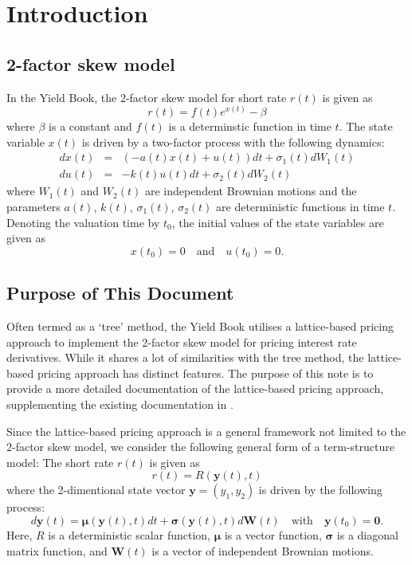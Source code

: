 \documentclass{texyise}
\begin{document}
\section{Introduction}

\subsection{2-factor skew model}

In the Yield Book, the 2-factor skew model for short rate $r(t)$ is given as
\begin{equation}
    r(t) = f(t) e^{x(t)} - \beta  \label{E:2fskew}
\end{equation}
where $\beta$ is a constant and $f(t)$ is a determinstic function in time $t$. The state variable $x(t)$ is driven by a two-factor process with the following dynamics:
\begin{eqnarray}
    dx(t) &=& (-a(t)x(t)+u(t))dt + \sigma_1(t) dW_1(t) \label{E:2fskew1} \\
    du(t) &=& -k(t)u(t)dt + \sigma_2(t) dW_2(t) \label{E:2fskew2}
\end{eqnarray}
where $W_1(t)$ and $W_2(t)$ are independent Brownian motions and the parameters $a(t)$, $k(t)$, $\sigma_1(t)$, $\sigma_2(t)$ are deterministic functions in time $t$.
Denoting the valuation time by $t_0$, the initial values of the state variables are given as
\begin{equation}
    x(t_0) = 0 \quad \text{and} \quad u(t_0) = 0.
\end{equation}

\subsection{Purpose of This Document}

Often termed as a `tree' method, the Yield Book utilises a lattice-based pricing approach to implement the 2-factor skew model for pricing interest rate derivatives. While it shares a lot of similarities with the tree method, the lattice-based pricing approach has distinct features. The purpose of this note is to provide a more detailed documentation of the lattice-based pricing approach, supplementing the existing documentation in \cite{2fs-citi-mv}.

Since the lattice-based pricing approach is a general framework not limited to the 2-factor skew model, we consider the following general form of a term-structure model: The short rate $r(t)$ is given as
\begin{equation}
    r(t) = R(\bm{y}(t), t) \label{E:short-rate-generic}
\end{equation}
where the 2-dimentional state vector $\bm{y} = (y_1, y_2)$ is driven by the following process:
\begin{equation}
    d\bm{y}(t) = \bm{\mu}(\bm{y}(t), t) dt + \bm{\sigma}(\bm{y}(t), t) d\bm{W}(t) 
    \quad\text{with}\quad \bm{y}(t_0) = \bm{0}.
    \label{E:state-variable-generic}
\end{equation}
Here, $R$ is a deterministic scalar function, $\bm{\mu}$ is a vector function, $\bm{\sigma}$ is a diagonal matrix function, and $\bm{W}(t)$ is a vector of independent Brownian motions.
\end{document}
